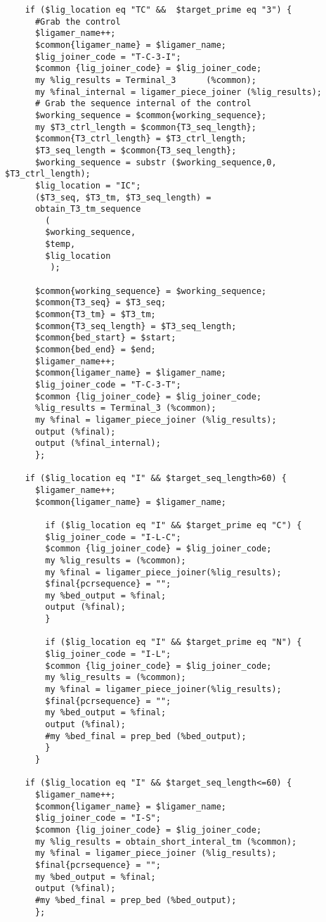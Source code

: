 \begin{lstlisting}
    if ($lig_location eq "TC" &&  $target_prime eq "3") {
      #Grab the control
      $ligamer_name++;
      $common{ligamer_name} = $ligamer_name;
      $lig_joiner_code = "T-C-3-I";
      $common {lig_joiner_code} = $lig_joiner_code;
      my %lig_results = Terminal_3		(%common);
      my %final_internal = ligamer_piece_joiner	(%lig_results);
      # Grab the sequence internal of the control
      $working_sequence = $common{working_sequence};
      my $T3_ctrl_length = $common{T3_seq_length};
      $common{T3_ctrl_length} = $T3_ctrl_length;
      $T3_seq_length = $common{T3_seq_length};
      $working_sequence = substr ($working_sequence,0, $T3_ctrl_length);
      $lig_location = "IC";
      ($T3_seq, $T3_tm, $T3_seq_length) =
      obtain_T3_tm_sequence
        (
        $working_sequence,
        $temp,
        $lig_location
         );

      $common{working_sequence} = $working_sequence;
      $common{T3_seq} = $T3_seq;
      $common{T3_tm} = $T3_tm;
      $common{T3_seq_length} = $T3_seq_length;
      $common{bed_start} = $start;
      $common{bed_end} = $end;
      $ligamer_name++;
      $common{ligamer_name} = $ligamer_name;
      $lig_joiner_code = "T-C-3-T";
      $common {lig_joiner_code} = $lig_joiner_code;
      %lig_results = Terminal_3 (%common);
      my %final = ligamer_piece_joiner (%lig_results);
      output (%final);
      output (%final_internal);
      };

    if ($lig_location eq "I" && $target_seq_length>60) {
      $ligamer_name++;
      $common{ligamer_name} = $ligamer_name;

        if ($lig_location eq "I" && $target_prime eq "C") {
        $lig_joiner_code = "I-L-C";
        $common {lig_joiner_code} = $lig_joiner_code;
        my %lig_results = (%common);
        my %final = ligamer_piece_joiner(%lig_results);
        $final{pcrsequence} = "";
        my %bed_output = %final;
        output (%final);
        }

        if ($lig_location eq "I" && $target_prime eq "N") {
        $lig_joiner_code = "I-L";
        $common {lig_joiner_code} = $lig_joiner_code;
        my %lig_results = (%common);
        my %final = ligamer_piece_joiner(%lig_results);
        $final{pcrsequence} = "";
        my %bed_output = %final;
        output (%final);
        #my %bed_final = prep_bed (%bed_output);
        }
      }

    if ($lig_location eq "I" && $target_seq_length<=60) {
      $ligamer_name++;
      $common{ligamer_name} = $ligamer_name;
      $lig_joiner_code = "I-S";
      $common {lig_joiner_code} = $lig_joiner_code;
      my %lig_results = obtain_short_interal_tm (%common);
      my %final = ligamer_piece_joiner (%lig_results);
      $final{pcrsequence} = "";
      my %bed_output = %final;
      output (%final);
      #my %bed_final = prep_bed (%bed_output);
      };


\end{lstlisting}
